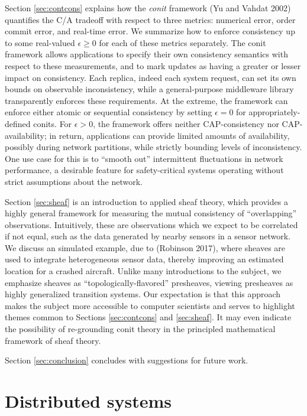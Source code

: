 \documentclass[]             %
{NASA}                       %
\theoremstyle{definition}
\begin{document}
Section \ref{sec:contcons} explains how the \emph{conit} framework (Yu
and Vahdat 2002) quantifies the C/A tradeoff with respect to three
metrics: numerical error, order commit error, and real-time error. We
summarize how to enforce consistency up to some real-valued
\(\epsilon \geq 0\) for each of these metrics separately. The conit
framework allows applications to specify their own consistency semantics
with respect to these measurements, and to mark updates as having a
greater or lesser impact on consistency. Each replica, indeed each
system request, can set its own bounds on observable inconsistency,
while a general-purpose middleware library transparently enforces these
requirements. At the extreme, the framework can enforce either atomic or
sequential consistency by setting \(\epsilon = 0\) for
appropriately-defined conits. For \(\epsilon > 0\), the framework offers
neither CAP-consistency nor CAP-availability; in return, applications
can provide limited amounts of availability, possibly during network
partitions, while strictly bounding levels of inconsistency. One use
case for this is to ``smooth out'' intermittent fluctuations in network
performance, a desirable feature for safety-critical systems operating
without strict assumptions about the network.

Section \ref{sec:sheaf} is an introduction to applied sheaf theory,
which provides a highly general framework for measuring the mutual
consistency of ``overlapping'' observations. Intuitively, these are
observations which we expect to be correlated if not equal, such as the
data generated by nearby sensors in a sensor network. We discuss an
simulated example, due to (Robinson 2017), where sheaves are used to
integrate heterogeneous sensor data, thereby improving an estimated
location for a crashed aircraft. Unlike many introductions to the
subject, we emphasize sheaves as ``topologically-flavored'' presheaves,
viewing presheaves as highly generalized transition systems. Our
expectation is that this approach makes the subject more accessible to
computer scientists and serves to highlight themes common to Sections
\ref{sec:contcons} and \ref{sec:sheaf}. It may even indicate the
possibility of re-grounding conit theory in the principled mathematical
framework of sheaf theory.

Section \ref{sec:conclusion} concludes with suggestions for future work.

\hypertarget{distributed-systems}{%
\section{Distributed systems}\label{distributed-systems}}
\end{document}
